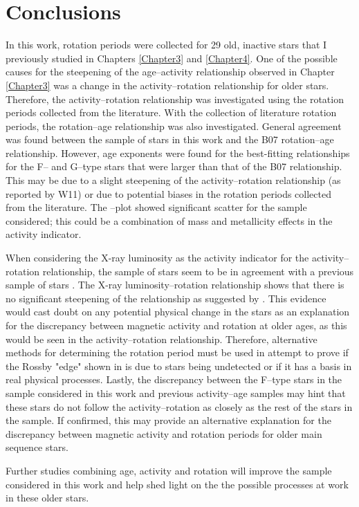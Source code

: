 \section{Conclusions}
In this work, rotation periods were collected for 29 old, inactive stars that I previously studied in Chapters \ref{Chapter3} and \ref{Chapter4}. One of the possible causes for the steepening of the age--activity relationship observed in Chapter \ref{Chapter3} was a change in the activity--rotation relationship for older stars. Therefore, the activity--rotation relationship was investigated using the rotation periods collected from the literature. With the collection of literature rotation periods, the rotation--age relationship was also investigated. General agreement was found between the sample of stars in this work and the B07 rotation--age relationship. However, age exponents were found for the best-fitting relationships for the F-- and G--type stars that were larger than that of the B07 relationship. This may be due to a slight steepening of the activity--rotation relationship (as reported by W11) or due to potential biases in the rotation periods collected from the literature. The \Rprime--\Ro plot showed significant scatter for the sample considered; this could be a combination of mass and metallicity effects in the \Rprime activity indicator.

When considering the X-ray luminosity as the activity indicator for the activity--rotation relationship, the sample of stars seem to be in agreement with a previous sample of stars \citep{Wright_etal_2011}. The X-ray luminosity--rotation relationship shows that there is no significant steepening of the relationship as suggested by \citet{Booth_etal_2017}. This evidence would cast doubt on any potential physical change in the stars as an explanation for the discrepancy between magnetic activity and rotation at older ages, as this would be seen in the activity--rotation relationship. Therefore, alternative methods for determining the rotation period must be used in attempt to prove if the Rossby "edge" shown in \citet{van_Saders_etal_2019} is due to stars being undetected or if it has a basis in real physical processes. Lastly, the discrepancy between the F--type stars in the sample considered in this work and previous activity--age samples may hint that these stars do not follow the activity--rotation as closely as the rest of the stars in the sample. If confirmed, this may provide an alternative explanation for the discrepancy between magnetic activity and rotation periods for older main sequence stars.

Further studies combining age, activity and rotation will improve the sample considered in this work and help shed light on the the possible processes at work in these older stars.